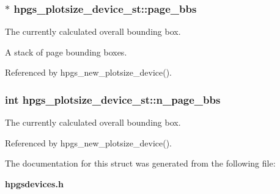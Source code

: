 \subsubsection[page\_\-bbs]{$\ast$ {\bf hpgs\_\-plotsize\_\-device\_\-st::page\_\-bbs}}\label{structhpgs__plotsize__device__st_016fbde7815a9034098f94cb60e0dcdd}


The currently calculated overall bounding box.

A stack of page bounding boxes. 

Referenced by hpgs\_\-new\_\-plotsize\_\-device().
\subsubsection[n\_\-page\_\-bbs]{\setlength{\rightskip}{0pt plus 5cm}int {\bf hpgs\_\-plotsize\_\-device\_\-st::n\_\-page\_\-bbs}}\label{structhpgs__plotsize__device__st_9375b4471761001e8a68d70e62612f0d}


The currently calculated overall bounding box. 

Referenced by hpgs\_\-new\_\-plotsize\_\-device().

The documentation for this struct was generated from the following file:\begin{CompactItemize}
\item 
{\bf hpgsdevices.h}\end{CompactItemize}
